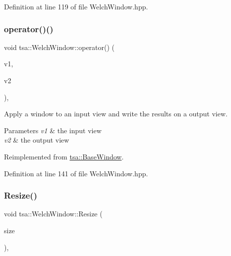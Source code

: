 Definition at line 119 of file Welch\+Window.\+hpp.

\mbox{\label{classtsa_1_1_welch_window_af6d14e181526f94d8ad6f1a2176db98a}} 
\subsubsection{\texorpdfstring{operator()()}{operator()()}\hspace{0.1cm}{\footnotesize\ttfamily [2/2]}}
{\footnotesize\ttfamily void tsa\+::\+Welch\+Window\+::operator() (\begin{DoxyParamCaption}\item[{\hyperlink{namespacetsa_ac599574bcc094eda25613724b8f3ca9e}{Seq\+View\+Double} \&}]{v1,  }\item[{\hyperlink{namespacetsa_ac599574bcc094eda25613724b8f3ca9e}{Seq\+View\+Double} \&}]{v2 }\end{DoxyParamCaption})\hspace{0.3cm}{\ttfamily [inline]}, {\ttfamily [virtual]}}

Apply a window to an input view and write the results on a output view.


\begin{DoxyParams}{Parameters}
{\em v1} & the input view \\
\hline
{\em v2} & the output view \\
\hline
\end{DoxyParams}


Reimplemented from \hyperlink{classtsa_1_1_base_window_afda50daa943527e09792b06e5ba69bcb}{tsa\+::\+Base\+Window}.



Definition at line 141 of file Welch\+Window.\+hpp.

\mbox{\label{classtsa_1_1_welch_window_a5ad861714524733e648660d817e219d6}} 
\subsubsection{\texorpdfstring{Resize()}{Resize()}}
{\footnotesize\ttfamily void tsa\+::\+Welch\+Window\+::\+Resize (\begin{DoxyParamCaption}\item[{unsigned int}]{size }\end{DoxyParamCaption})\hspace{0.3cm}{\ttfamily [inline]}, {\ttfamily [virtual]}}

